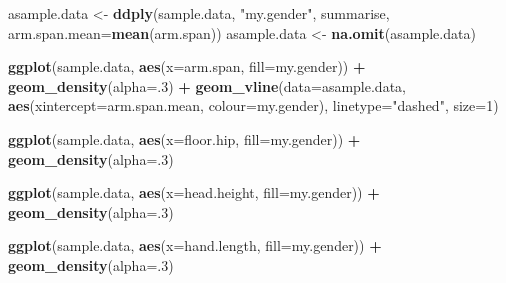 \documentclass[]{article}
\newenvironment{Shaded}{\begin{snugshade}}{\end{snugshade}}
\newcommand{\DataTypeTok}[1]{\textcolor[rgb]{0.13,0.29,0.53}{#1}}
\newcommand{\DecValTok}[1]{\textcolor[rgb]{0.00,0.00,0.81}{#1}}
\newcommand{\KeywordTok}[1]{\textcolor[rgb]{0.13,0.29,0.53}{\textbf{#1}}}
\newcommand{\NormalTok}[1]{#1}
\newcommand{\OperatorTok}[1]{\textcolor[rgb]{0.81,0.36,0.00}{\textbf{#1}}}
\newcommand{\StringTok}[1]{\textcolor[rgb]{0.31,0.60,0.02}{#1}}
\begin{document}
\begin{Shaded}
\begin{Highlighting}[]
\NormalTok{asample.data \textless{}{-}}\StringTok{ }\KeywordTok{ddply}\NormalTok{(sample.data, }\StringTok{"my.gender"}\NormalTok{, summarise, }\DataTypeTok{arm.span.mean=}\KeywordTok{mean}\NormalTok{(arm.span))}
\NormalTok{asample.data \textless{}{-}}\StringTok{ }\KeywordTok{na.omit}\NormalTok{(asample.data)}

\KeywordTok{ggplot}\NormalTok{(sample.data, }\KeywordTok{aes}\NormalTok{(}\DataTypeTok{x=}\NormalTok{arm.span, }\DataTypeTok{fill=}\NormalTok{my.gender)) }\OperatorTok{+}\StringTok{ }\KeywordTok{geom\_density}\NormalTok{(}\DataTypeTok{alpha=}\NormalTok{.}\DecValTok{3}\NormalTok{) }\OperatorTok{+}
\StringTok{        }\KeywordTok{geom\_vline}\NormalTok{(}\DataTypeTok{data=}\NormalTok{asample.data, }\KeywordTok{aes}\NormalTok{(}\DataTypeTok{xintercept=}\NormalTok{arm.span.mean,  }\DataTypeTok{colour=}\NormalTok{my.gender), }\DataTypeTok{linetype=}\StringTok{"dashed"}\NormalTok{, }\DataTypeTok{size=}\DecValTok{1}\NormalTok{)}
\end{Highlighting}
\end{Shaded}

\begin{Shaded}
\begin{Highlighting}[]
\KeywordTok{ggplot}\NormalTok{(sample.data, }\KeywordTok{aes}\NormalTok{(}\DataTypeTok{x=}\NormalTok{floor.hip, }\DataTypeTok{fill=}\NormalTok{my.gender)) }\OperatorTok{+}\StringTok{ }\KeywordTok{geom\_density}\NormalTok{(}\DataTypeTok{alpha=}\NormalTok{.}\DecValTok{3}\NormalTok{)}
\end{Highlighting}
\end{Shaded}

\begin{Shaded}
\begin{Highlighting}[]
\KeywordTok{ggplot}\NormalTok{(sample.data, }\KeywordTok{aes}\NormalTok{(}\DataTypeTok{x=}\NormalTok{head.height, }\DataTypeTok{fill=}\NormalTok{my.gender)) }\OperatorTok{+}\StringTok{ }\KeywordTok{geom\_density}\NormalTok{(}\DataTypeTok{alpha=}\NormalTok{.}\DecValTok{3}\NormalTok{)}
\end{Highlighting}
\end{Shaded}

\begin{Shaded}
\begin{Highlighting}[]
\KeywordTok{ggplot}\NormalTok{(sample.data, }\KeywordTok{aes}\NormalTok{(}\DataTypeTok{x=}\NormalTok{hand.length, }\DataTypeTok{fill=}\NormalTok{my.gender)) }\OperatorTok{+}\StringTok{ }\KeywordTok{geom\_density}\NormalTok{(}\DataTypeTok{alpha=}\NormalTok{.}\DecValTok{3}\NormalTok{)}
\end{Highlighting}
\end{Shaded}
\end{document}
